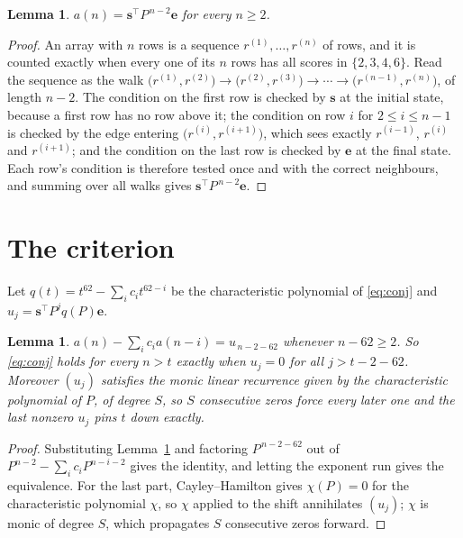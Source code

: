 \documentclass[11pt,a4paper]{article}
\theoremstyle{plain}
\newtheorem{lemma}[theorem]{Lemma}
\theoremstyle{definition}
\begin{document}
\begin{lemma}\label{lem:walk}
$a(n)=\mathbf{s}^{\!\top}P^{\,n-2}\mathbf{e}$ for every $n\ge2$.
\end{lemma}

\begin{proof}
An array with $n$ rows is a sequence $r^{(1)},\dots,r^{(n)}$ of rows, and it is counted
exactly when every one of its $n$ rows has all scores in $\{2,3,4,6\}$. Read the sequence as the
walk $\bigl(r^{(1)},r^{(2)}\bigr)\to\bigl(r^{(2)},r^{(3)}\bigr)\to\cdots\to
\bigl(r^{(n-1)},r^{(n)}\bigr)$, of length $n-2$. The condition on the first row is
checked by $\mathbf{s}$ at the initial state, because a first row has no row above it; the
condition on row $i$ for $2\le i\le n-1$ is checked by the edge entering
$\bigl(r^{(i)},r^{(i+1)}\bigr)$, which sees exactly $r^{(i-1)}$, $r^{(i)}$ and
$r^{(i+1)}$; and the condition on the last row is checked by $\mathbf{e}$ at the final
state. Each row's condition is therefore tested once and with the correct neighbours, and
summing over all walks gives $\mathbf{s}^{\!\top}P^{\,n-2}\mathbf{e}$.
\end{proof}

\section{The criterion}

Let $q(t)=t^{62}-\sum_i c_i t^{62-i}$ be the characteristic polynomial of
\eqref{eq:conj} and $u_j=\mathbf{s}^{\!\top}P^{j}q(P)\mathbf{e}$.

\begin{lemma}\label{lem:crit}
$a(n)-\sum_i c_i a(n-i)=u_{\,n-2-62}$ whenever $n-62\ge2$. So \eqref{eq:conj}
holds for every $n>t$ exactly when $u_j=0$ for all $j>t-2-62$. Moreover $(u_j)$
satisfies the monic linear recurrence given by the characteristic polynomial of $P$, of
degree $S$, so $S$ consecutive zeros force every later one and the last nonzero $u_j$ pins
$t$ down exactly.
\end{lemma}

\begin{proof}
Substituting Lemma~\ref{lem:walk} and factoring $P^{\,n-2-62}$ out of
$P^{n-2}-\sum_i c_i P^{n-i-2}$ gives the identity, and letting the exponent run gives the
equivalence. For the last part, Cayley--Hamilton gives $\chi(P)=0$ for the characteristic
polynomial $\chi$, so $\chi$ applied to the shift annihilates $(u_j)$; $\chi$ is monic of
degree $S$, which propagates $S$ consecutive zeros forward.
\end{proof}
\end{document}
